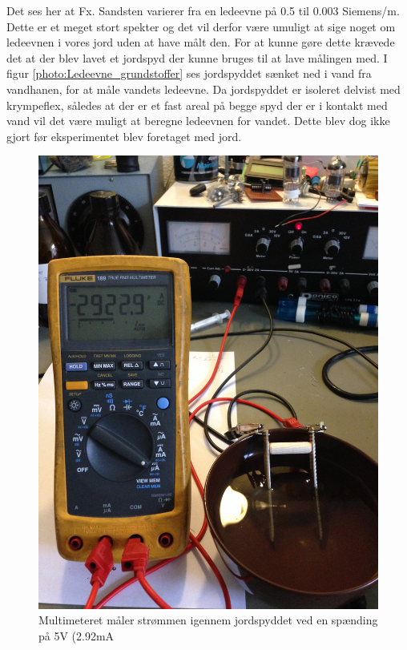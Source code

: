 Det ses her at Fx. Sandsten varierer fra en ledeevne på 0.5 til 0.003 Siemens/m. Dette er et meget stort spekter og det vil derfor være umuligt at sige noget om ledeevnen i vores jord uden at have målt den. For at kunne gøre dette krævede det at der blev lavet et jordspyd der kunne bruges til at lave målingen med. I figur \ref{photo:Ledeevne_grundstoffer} ses jordspyddet sænket ned i vand fra vandhanen, for at måle vandets ledeevne. Da jordspyddet er isoleret delvist med krympeflex, således at der er et fast areal på begge spyd der er i kontakt med vand vil det være muligt at beregne ledeevnen for vandet. Dette blev dog ikke gjort før eksperimentet blev foretaget med jord. 

\begin{figure}[H]
	\centering 
	\includegraphics[scale=0.07]{HardwareArkitektur/Sensore/Jordfugt_billeder/Jordspyd_i_vand.JPG}
	\caption{Multimeteret måler strømmen igennem jordspyddet ved en spænding på 5V (2.92mA}
	\label{photo:Jordspyd_vand}
\end{figure}  

